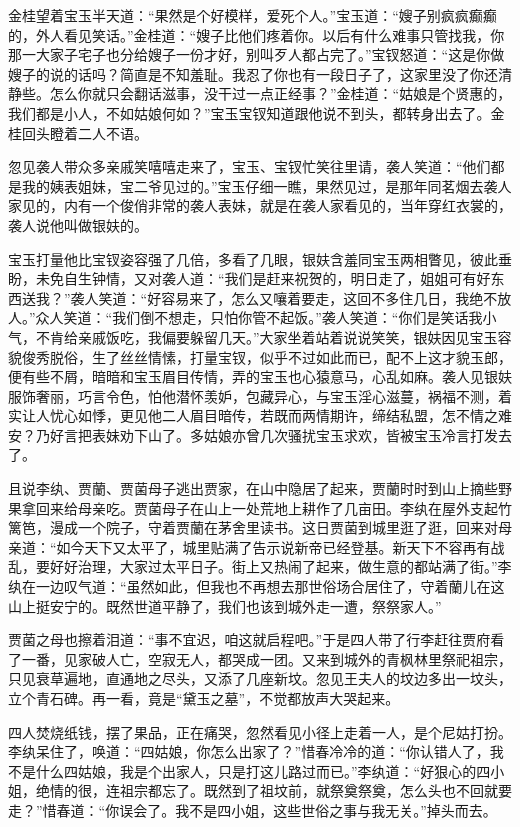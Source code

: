 \documentclass[12pt,oneside]{book}
\begin{document}
金桂望着宝玉半天道：“果然是个好模样，爱死个人。”宝玉道：“嫂子别疯疯癫癫的，外人看见笑话。”金桂道：“嫂子比他们疼着你。以后有什么难事只管找我，你那一大家子宅子也分给嫂子一份才好，别叫歹人都占完了。”宝钗怒道：“这是你做嫂子的说的话吗？简直是不知羞耻。我忍了你也有一段日子了，这家里没了你还清静些。怎么你就只会翻话滋事，没干过一点正经事？”金桂道：“姑娘是个贤惠的，我们都是小人，不如姑娘何如？”宝玉宝钗知道跟他说不到头，都转身出去了。金桂回头瞪着二人不语。

忽见袭人带众多亲戚笑嘻嘻走来了，宝玉、宝钗忙笑往里请，袭人笑道：“他们都是我的姨表姐妹，宝二爷见过的。”宝玉仔细一瞧，果然见过，是那年同茗烟去袭人家见的，内有一个俊俏非常的袭人表妹，就是在袭人家看见的，当年穿红衣裳的，袭人说他叫做银妋的。

宝玉打量他比宝钗姿容强了几倍，多看了几眼，银妋含羞同宝玉两相瞥见，彼此垂盼，未免自生钟情，又对袭人道：“我们是赶来祝贺的，明日走了，姐姐可有好东西送我？”袭人笑道：“好容易来了，怎么又嚷着要走，这回不多住几日，我绝不放人。”众人笑道：“我们倒不想走，只怕你管不起饭。”袭人笑道：“你们是笑话我小气，不肯给亲戚饭吃，我偏要躲留几天。”大家坐着站着说说笑笑，银妋因见宝玉容貌俊秀脱俗，生了丝丝情愫，打量宝钗，似乎不过如此而已，配不上这才貌玉郎，便有些不屑，暗暗和宝玉眉目传情，弄的宝玉也心猿意马，心乱如麻。袭人见银妋服饰奢丽，巧言令色，怕他潜怀羡妒，包藏异心，与宝玉淫心滋蔓，祸福不测，着实让人忧心如悸，更见他二人眉目暗传，若既而两情期许，缔结私盟，怎不情之难安？乃好言把表妹劝下山了。多姑娘亦曾几次骚扰宝玉求欢，皆被宝玉冷言打发去了。

且说李纨、贾蘭、贾菌母子逃出贾家，在山中隐居了起来，贾蘭时时到山上摘些野果拿回来给母亲吃。贾菌母子在山上一处荒地上耕作了几亩田。李纨在屋外支起竹篱笆，漫成一个院子，守着贾蘭在茅舍里读书。这日贾菌到城里逛了逛，回来对母亲道：“如今天下又太平了，城里贴满了告示说新帝已经登基。新天下不容再有战乱，要好好治理，大家过太平日子。街上又热闹了起来，做生意的都站满了街。”李纨在一边叹气道：“虽然如此，但我也不再想去那世俗场合居住了，守着蘭儿在这山上挺安宁的。既然世道平静了，我们也该到城外走一遭，祭祭家人。”

贾菌之母也擦着泪道：“事不宜迟，咱这就启程吧。”于是四人带了行李赶往贾府看了一番，见家破人亡，空寂无人，都哭成一团。又来到城外的青枫林里祭祀祖宗，只见衰草遍地，直通地之尽头，又添了几座新坟。忽见王夫人的坟边多出一坟头，立个青石碑。再一看，竟是“黛玉之墓”，不觉都放声大哭起来。

四人焚烧纸钱，摆了果品，正在痛哭，忽然看见小径上走着一人，是个尼姑打扮。李纨呆住了，唤道：“四姑娘，你怎么出家了？”惜春冷冷的道：“你认错人了，我不是什么四姑娘，我是个出家人，只是打这儿路过而已。”李纨道：“好狠心的四小姐，绝情的很，连祖宗都忘了。既然到了祖坟前，就祭奠祭奠，怎么头也不回就要走？”惜春道：“你误会了。我不是四小姐，这些世俗之事与我无关。”掉头而去。
\end{document}
